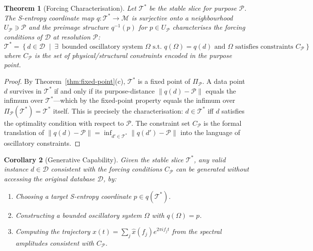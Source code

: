 \documentclass[10pt,twocolumn]{article}
\newtheorem{theorem}{Theorem}[section]
\newtheorem{corollary}[theorem]{Corollary}
\newcommand{\ProbeOp}{\Pi_\mathcal{P}}
\newcommand{\TruthCell}{\mathcal{T}}
\newcommand{\PurposePoint}{\mathcal{P}}
\newcommand{\DataSpace}{\mathcal{D}}
\newcommand{\ManifoldM}{\mathcal{M}}
\begin{document}
\begin{theorem}[Forcing Characterisation]
\label{thm:forcing}
Let $\TruthCell^*$ be the stable slice for purpose $\PurposePoint$.
The S-entropy coordinate map $q : \TruthCell^* \to \ManifoldM$ is surjective
onto a neighbourhood $U_\PurposePoint \ni \PurposePoint$ and
the preimage structure $q^{-1}(p)$ for $p \in U_\PurposePoint$ characterises
the \emph{forcing conditions} of $\DataSpace$ at resolution $\PurposePoint$:
\begin{equation}
\TruthCell^* = \left\{ d \in \DataSpace \;\middle|\;
  \exists\, \text{ bounded oscillatory system } \Omega \text{ s.t. } q(\Omega) = q(d) \text{ and } \Omega \text{ satisfies constraints } C_\PurposePoint
\right\}
\label{eq:forcing}
\end{equation}
where $C_\PurposePoint$ is the set of physical/structural constraints
encoded in the purpose point.
\end{theorem}

\begin{proof}
By Theorem~\ref{thm:fixed-point}(c), $\TruthCell^*$ is a fixed point of $\ProbeOp$.
A data point $d$ survives in $\TruthCell^*$ if and only if its purpose-distance
$\|q(d) - \PurposePoint\|$ equals the infimum over $\TruthCell^*$---which by
the fixed-point property equals the infimum over $\ProbeOp(\TruthCell^*) = \TruthCell^*$
itself. This is precisely the characterisation: $d \in \TruthCell^*$ iff
$d$ satisfies the optimality condition with respect to $\PurposePoint$.
The constraint set $C_\PurposePoint$ is the formal translation of
$\|q(d) - \PurposePoint\| = \inf_{d' \in \TruthCell^*} \|q(d') - \PurposePoint\|$
into the language of oscillatory constraints.
\end{proof}

\begin{corollary}[Generative Capability]
\label{cor:generative}
Given the stable slice $\TruthCell^*$, any valid instance $d \in \DataSpace$
consistent with the forcing conditions $C_\PurposePoint$ can be generated
without accessing the original database $\DataSpace$, by:
\begin{enumerate}[label=(\roman*)]
\item Choosing a target S-entropy coordinate $p \in q(\TruthCell^*)$.
\item Constructing a bounded oscillatory system $\Omega$ with $q(\Omega) = p$.
\item Computing the trajectory $x(t) = \sum_j \hat{x}(f_j) e^{2\pi i f_j t}$
      from the spectral amplitudes consistent with $C_\PurposePoint$.
\end{enumerate}
\end{corollary}
\end{document}

